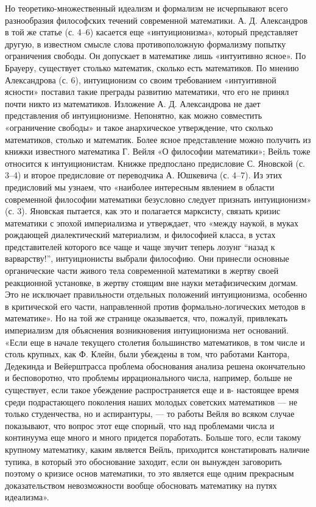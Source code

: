 Но теоретико-множественный  идеализм и формализм не  исчерпывают всего
разнообразия  философских   течений  современной  математики.   А.  Д.
Александров в  той же статье  (с. 4--6) касается  еще «интуиционизма»,
который представляет другую, в  известном смысле слова противоположную
формализму попытку ограничения свободы. Он допускает в математике лишь
«интуитивно ясное». По Брауеру,  существует столько математик, сколько
есть математиков. По мнению Александрова (с. 6), интуиционизм со своим
требованием  «интуитивной ясности»  поставил  такие преграды  развитию
математики, что его не принял почти никто из математиков. Изложение А.
Д.  Александрова не  дает представления  об интуиционизме.  Непонятно,
как  можно  совместить  «ограничение  свободы»  и  такое  анархическое
утверждение, что сколько математиков, столько и математик. Более ясное
представление можно получить из  книжки известного математика Г. Вейля
«О  философии  математики»;  Вейль тоже  относится  к  интуиционистам.
Книжке  предпослано  предисловие  С.   Яновской  (с.  3--4)  и  второе
предисловие от переводчика А. Юшкевича  (с. 4--7). Из этих предисловий
мы  узнаем, что  «наиболее интересным  явлением в  области современной
философии математики безусловно следует признать интуиционизм» (с. 3).
Яновская  пытается, как  это  и полагается  марксисту, связать  кризис
математики с  эпохой империализма и  утверждает, что «между  наукой, в
муках  рождающей  диалектический  материализм,  и  философией  класса,
в  устах  представителей  которого  все  чаще  и  чаще  звучит  теперь
лозунг  ``назад  к  варварству!'',  интуиционисты  выбрали  философию.
Они  принесли  основные  органические части  живого  тела  современной
математики  в жертву  своей  реакционной установке,  в жертву  стоящим
вне  науки  метафизическим  догмам.   Это  не  исключает  правильности
отдельных положений  интуиционизма, особенно в критической  его части,
направленной против формально-логических методов  в математике». Но на
той же странице оказывается,  что, пожалуй, привлекать империализм для
объяснения  возникновения интуиционизма  нет  оснований.  «Если еще  в
начале  текущего  столетия  большинство  математиков, в  том  числе  и
столь  крупных,  как Ф.  Клейн,  были  убеждены  в том,  что  работами
Кантора, Дедекинда и Вейерштрасса  проблема обоснования анализа решена
окончательно  и  бесповоротно,  что  проблемы  иррационального  числа,
например, больше не существует,  если такое убеждение распространяется
еще и в-  настоящее время среди подрастающего  поколения наших молодых
советских математиков  --- не  только студенчества, но  и аспирантуры,
--- то работы  Вейля во всяком случае показывают, что  вопрос этот еще
спорный,  что над  проблемами числа  и  континуума еще  много и  много
придется  поработать. Больше  того, если  такому крупному  математику,
каким  является Вейль,  приходится  констатировать  наличие тупика,  в
который это обоснование заходит, если он вынужден заговорить поэтому о
кризисе  основ  математики,  то  это  является  еще  одним  прекрасным
доказательством  невозможности вообще  обосновать математику  на путях
идеализма».

